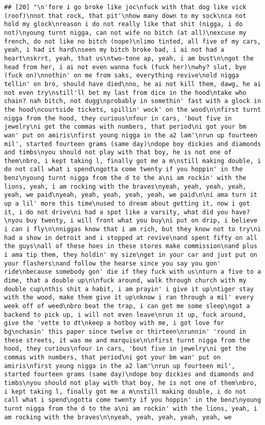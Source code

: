 \documentclass[]{article}
\begin{document}
\begin{verbatim}
## [20] "\n'fore i go broke like joc\nfuck with that dog like vick (roof)\nnot that rock, that pit'\nhow many down to my sock\nca not hold my glock\nreason i do not really like that shit (nigga, i do not)\nyoung turnt nigga, can not wife no bitch (at all)\nexcuse my french, do not like no bitch (nope)\nlimo tinted, all five of my cars, yeah, i had it hard\nseen my bitch broke bad, i ai not had a heart\nskrrt, yeah, that us\ntwo-tone ap, yeah, i am bust\n\ngot the head from her, i ai not even wanna fuck (fuck her)\nwhy? slut, bye (fuck on)\nnothin' on me from saks, everything revive\nold nigga tellin' on bro, should have died\nno, he ai not kill them, dawg, he ai not even try\nstill'll bet my last from dice in the hood\ntake who chain? nah bitch, not dugg\nprobably in somethin' fast with a glock in the hood\ncourtside tickets, spillin' wock' on the wood\n\nfirst turnt nigga from the hood, they curious\nfour in cars, 'bout five in jewelry\ni get the commas with numbers, that period\ni got your bm wan' put on amiris\nfirst young nigga in the a2 lam'\nrun up fourteen mil', started fourteen grams (same day)\ndope boy dickies and diamonds and timbs\nyou should not play with that boy, he is not one of them\nbro, i kept taking l, finally got me a m\nstill making double, i do not call what i spend\ngotta come twenty if you hoppin' in the benz\nyoung turnt nigga from the d to the a\ni am rockin' with the lions, yeah, i am rocking with the braves\nyeah, yeah, yeah, yeah, yeah, we paid\nyeah, yeah, yeah, yeah, yeah, we paid\n\ni ama turn it up a lil' more this time\nused to dream about getting it, now i got it, i do not drive\ni had a spot like a varsity, what did you have?\nyou buy twenty, i will front what you buy\ni put on drip, i believe i can i fly\n\nniggas know that i am rich, but they know not to try\ni had a show in detroit and i stopped at revive\nand spent fifty on all the guys\nall of these hoes in these stores make commission\nand plus i ama tip them, they holdin' my size\nget in your car and just put on your flashers\nand follow the hearse since you say you gon' ride\nbecause somebody gon' die if they fuck with us\nturn a five to a dime, that a double up\n\nfuck around, walk through church with my double cup\nthis shit a habit, i am prayin' i give it up\ntiger stay with the wood, make them give it up\nknow i ran through a mil' every week off of weed\nbro beat the trap, i can get me some sleep\ngot a backend to pick up, i will not even leave\nrun it up, fuck around, give the 'vette to dt\nkeep a hotboy with me, i got love for bg\nchasin' this paper since twelve or thirteen\nrunnin' 'round in these streets, it was me and marquise\n\nfirst turnt nigga from the hood, they curious\nfour in cars, 'bout five in jewelry\ni get the commas with numbers, that period\ni got your bm wan' put on amiris\nfirst young nigga in the a2 lam'\nrun up fourteen mil', started fourteen grams (same day)\ndope boy dickies and diamonds and timbs\nyou should not play with that boy, he is not one of them\nbro, i kept taking l, finally got me a m\nstill making double, i do not call what i spend\ngotta come twenty if you hoppin' in the benz\nyoung turnt nigga from the d to the a\ni am rockin' with the lions, yeah, i am rocking with the braves\n\nyeah, yeah, yeah, yeah, yeah, we 
\end{verbatim}
\end{document}
